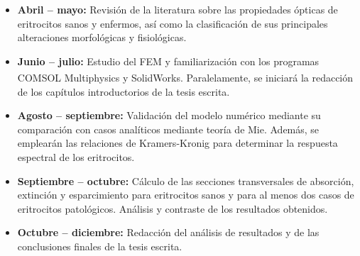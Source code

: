 \documentclass[11pt,letterpaper]{article}
\begin{document}
	\begin{itemize} 
		\item \textbf{Abril – mayo:} Revisión de la literatura sobre las propiedades ópticas de eritrocitos sanos y enfermos, así como la clasificación de sus principales alteraciones morfológicas y fisiológicas.
		\item \textbf{Junio – julio:} Estudio del FEM y familiarización con los programas COMSOL Multiphysics\textsuperscript{\texttrademark} y SolidWorks. Paralelamente, se iniciará la redacción de los capítulos introductorios de la tesis escrita.
		
		\item \textbf{Agosto – septiembre:} Validación del modelo numérico mediante su comparación con casos analíticos mediante teoría de Mie. Además, se emplearán las relaciones de Kramers-Kronig para determinar la respuesta espectral de los eritrocitos. 
		
		\item \textbf{Septiembre – octubre:} Cálculo de las secciones transversales de absorción, extinción y esparcimiento para eritrocitos sanos y para al menos dos casos de eritrocitos patológicos. Análisis y contraste de los resultados obtenidos.
		
		\item \textbf{Octubre – diciembre:} Redacción del análisis de resultados y de las conclusiones finales de la tesis escrita.
	\end{itemize}
	
\end{document}
